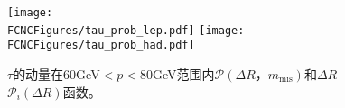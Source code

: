 
\begin{figure}[htb]
\centering
\texttt{[image: \\FCNCFigures/tau\_prob\_lep.pdf]}
\texttt{[image: \\FCNCFigures/tau\_prob\_had.pdf]}
\caption{$\tau$的动量在60GeV$<p<80$GeV范围内$\mathcal{P}(\Delta R，m_{\mathrm{mis}})$和$\Delta R$$\mathcal{P}_i(\Delta R)$函数。}
\label{fig:tau_prob}
\end{figure}